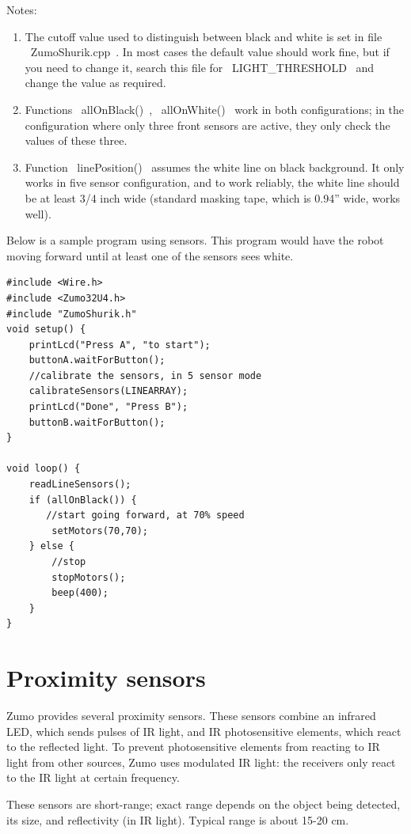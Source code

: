 \documentclass[oneside]{stml-l}
\numberwithin{figure}{chapter}
\begin{document}
Notes:
\begin{enumerate}
\item The cutoff value used to distinguish between black and white
is set in file ~ZumoShurik.cpp~. In most cases the default value
should work fine, but if you need to change it, search this file
for ~LIGHT_THRESHOLD~ and change the value as required.

\item Functions ~allOnBlack()~, ~allOnWhite()~ work in both configurations;
in the configuration where only three front sensors are active, they
only check the values of these three.

\item Function ~linePosition()~ assumes the white line on
black background. It only works in five sensor configuration, and
to work reliably, the white line should be at least 3/4 inch wide
(standard masking tape, which is 0.94'' wide, works well).

\end{enumerate}

 Below is a sample program using sensors. This program would have
 the robot moving forward until at least one of the sensors sees white.


 \begin{lstlisting}
#include <Wire.h>
#include <Zumo32U4.h>
#include "ZumoShurik.h"
void setup() {
    printLcd("Press A", "to start");
    buttonA.waitForButton();
    //calibrate the sensors, in 5 sensor mode
    calibrateSensors(LINEARRAY);
    printLcd("Done", "Press B");
    buttonB.waitForButton();
}

void loop() {
    readLineSensors();
    if (allOnBlack()) {
       //start going forward, at 70% speed
        setMotors(70,70);
    } else {
        //stop
        stopMotors();
        beep(400);
    }
}
\end{lstlisting}


\section{Proximity sensors}
Zumo provides several proximity sensors. These sensors combine an
infrared LED, which sends pulses of IR light, and IR photosensitive elements,
which react to the reflected light. To prevent photosensitive elements
from reacting to IR light from other sources, Zumo uses modulated
IR light: the receivers only react to the IR light at certain frequency.

These sensors are short-range; exact range depends on the object
being detected, its size,  and reflectivity (in IR light). Typical range
is about 15-20 cm.
\end{document}
